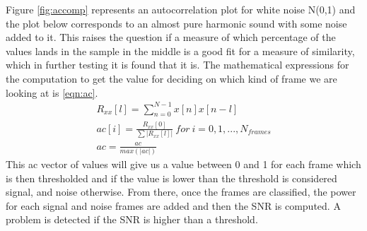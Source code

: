 Figure \ref{fig:accomp} represents an autocorrelation plot for white noise N(0,1)
and the plot below corresponds to an almost pure harmonic sound with some noise added to it. This raises the question if a measure of which 
percentage of the values lands in the sample in the middle is a good fit for a measure of similarity, which in further testing it is found that it is.
The mathematical expressions for the computation to get the value for deciding on which kind of frame we are looking at is \ref{eqn:ac}.
\begin{equation}\label{eqn:ac}
	\begin{matrix}
		R_{xx}[l]=\sum_{n=0}^{N-1}x[n]x[n-l]\\
		ac[i]=\frac{R_{xx}[0]}{\sum \left | R_{xx}[l] \right |} \ for\ i=0,1,...,N_{frames}\\ 
		ac = \frac{ac}{max(\left | ac \right |)}
	\end{matrix}
\end{equation}
This ac vector of values will give us a value between 0 and 1 for each frame which is then thresholded and if the value is lower than the threshold is 
considered signal, and noise otherwise.
From there, once the frames are classified, the power for each signal and noise frames are added and then the SNR is computed. A problem is detected if 
the SNR is higher than a threshold.

\newpage
